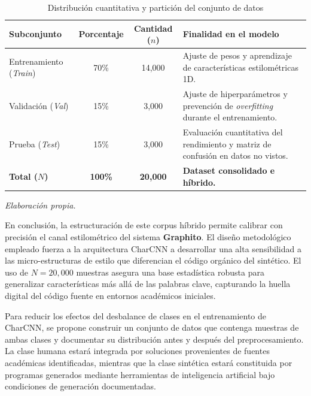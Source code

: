\begin{table}[H]
	\centering
	\caption{Distribución cuantitativa y partición del conjunto de datos}
	\label{tab:distribucion_muestras}
	\renewcommand{\arraystretch}{1.6}
	\begin{tabularx}{\textwidth}{l c c X}
		\toprule
		\textbf{Subconjunto}           & \textbf{Porcentaje} & \textbf{Cantidad ($n$)} & \textbf{Finalidad en el modelo}                                                          \\
		\midrule
		Entrenamiento (\textit{Train}) & 70\%                & 14,000                  & Ajuste de pesos y aprendizaje de características estilométricas 1D.                      \\

		\addlinespace

		Validación (\textit{Val})      & 15\%                & 3,000                   & Ajuste de hiperparámetros y prevención de \textit{overfitting} durante el entrenamiento. \\

		\addlinespace

		Prueba (\textit{Test})         & 15\%                & 3,000                   & Evaluación cuantitativa del rendimiento y matriz de confusión en datos no vistos.        \\

		\midrule
		\textbf{Total ($N$)}           & \textbf{100\%}      & \textbf{20,000}         & \textbf{Dataset consolidado e híbrido.}                                                  \\
		\bottomrule
	\end{tabularx}
	\smallskip
	\footnotesize\textit{Elaboración propia.}
\end{table}

En conclusión, la estructuración de este corpus híbrido permite calibrar con precisión el canal estilométrico del sistema \textbf{Graphito}. El diseño metodológico empleado fuerza a la arquitectura CharCNN a desarrollar una alta sensibilidad a las micro-estructuras de estilo que diferencian el código orgánico del sintético. El uso de $N = 20,000$ muestras asegura una base estadística robusta para generalizar características más allá de las palabras clave, capturando la huella digital del código fuente en entornos académicos iniciales.

Para reducir los efectos del desbalance de clases en el entrenamiento de CharCNN, se propone construir un conjunto de datos que contenga muestras de ambas clases y documentar su distribución antes y después del preprocesamiento. La clase humana estará integrada por soluciones provenientes de fuentes académicas identificadas, mientras que la clase sintética estará constituida por programas generados mediante herramientas de inteligencia artificial bajo condiciones de generación documentadas.

